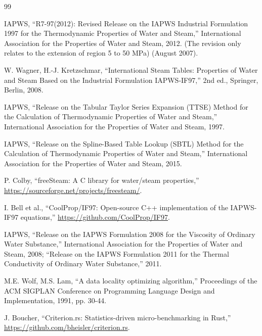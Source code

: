 \documentclass{article}
\begin{document}
\begin{thebibliography}{99}

IAPWS, ``R7-97(2012): Revised Release on the IAPWS Industrial Formulation 1997 for the Thermodynamic Properties of Water and Steam,'' International Association for the Properties of Water and Steam, 2012. (The revision only relates to the extension of region 5 to 50 MPa) (August 2007).

W. Wagner, H.-J. Kretzschmar, ``International Steam Tables: Properties of Water and Steam Based on the Industrial Formulation IAPWS-IF97,'' 2nd ed., Springer, Berlin, 2008.

IAPWS, ``Release on the Tabular Taylor Series Expansion (TTSE) Method for the Calculation of Thermodynamic Properties of Water and Steam,'' International Association for the Properties of Water and Steam, 1997.

IAPWS, ``Release on the Spline-Based Table Lookup (SBTL) Method for the Calculation of Thermodynamic Properties of Water and Steam,'' International Association for the Properties of Water and Steam, 2015.

P. Colby, ``freeSteam: A C library for water/steam properties,'' \url{https://sourceforge.net/projects/freesteam/}.

I. Bell et al., ``CoolProp/IF97: Open-source C++ implementation of the IAPWS-IF97 equations,'' \url{https://github.com/CoolProp/IF97}.

IAPWS, ``Release on the IAPWS Formulation 2008 for the Viscosity of Ordinary Water Substance,'' International Association for the Properties of Water and Steam, 2008; ``Release on the IAPWS Formulation 2011 for the Thermal Conductivity of Ordinary Water Substance,'' 2011.

M.E. Wolf, M.S. Lam, ``A data locality optimizing algorithm,'' Proceedings of the ACM SIGPLAN Conference on Programming Language Design and Implementation, 1991, pp. 30-44.

J. Boucher, ``Criterion.rs: Statistics-driven micro-benchmarking in Rust,'' \url{https://github.com/bheisler/criterion.rs}.


\end{thebibliography}
\end{document}
